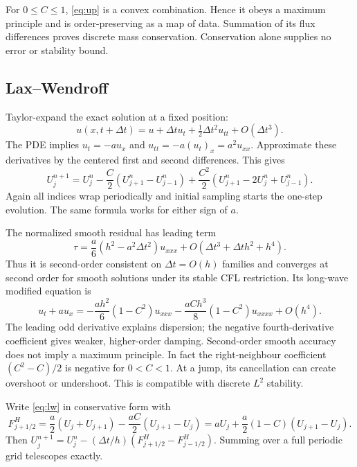 For $0\le C\le1$, \eqref{eq:up} is a convex combination. Hence it obeys a maximum principle and is order-preserving as a map of data. Summation of its flux differences proves discrete mass conservation. Conservation alone supplies no error or stability bound.

\subsection{Lax--Wendroff}
Taylor-expand the exact solution at a fixed position:
\begin{equation}
 u(x,t+\Delta t)=u+\Delta t u_t+\tfrac12\Delta t^2u_{tt}+O(\Delta t^3).
\end{equation}
The PDE implies $u_t=-a u_x$ and $u_{tt}=-a(u_t)_x=a^2u_{xx}$. Approximate these derivatives by the centered first and second differences. This gives
\begin{equation}\label{eq:lw}
 U_j^{n+1}=U_j^n-\frac C2(U_{j+1}^n-U_{j-1}^n)
 +\frac{C^2}{2}(U_{j+1}^n-2U_j^n+U_{j-1}^n).
\end{equation}
Again all indices wrap periodically and initial sampling starts the one-step evolution. The same formula works for either sign of $a$.

The normalized smooth residual has leading term
\begin{equation}
 \tau=\frac{a}{6}(h^2-a^2\Delta t^2)u_{xxx}
 +O(\Delta t^3+\Delta t h^2+h^4).
\end{equation}
Thus it is second-order consistent on $\Delta t=O(h)$ families and converges at second order for smooth solutions under its stable CFL restriction. Its long-wave modified equation is
\begin{equation}\label{eq:modlw}
 u_t+a u_x=-\frac{ah^2}{6}(1-C^2)u_{xxx}
 -\frac{aCh^3}{8}(1-C^2)u_{xxxx}+O(h^4).
\end{equation}
The leading odd derivative explains dispersion; the negative fourth-derivative coefficient gives weaker, higher-order damping. Second-order smooth accuracy does not imply a maximum principle. In fact the right-neighbour coefficient $(C^2-C)/2$ is negative for $0<C<1$. At a jump, its cancellation can create overshoot or undershoot. This is compatible with discrete $L^2$ stability.

Write \eqref{eq:lw} in conservative form with
\begin{equation}\label{eq:lwflux}
 F^{H}_{j+1/2}=\frac a2(U_j+U_{j+1})-\frac{aC}{2}(U_{j+1}-U_j)
 =aU_j+\frac a2(1-C)(U_{j+1}-U_j).
\end{equation}
Then $U_j^{n+1}=U_j^n-(\Delta t/h)(F^H_{j+1/2}-F^H_{j-1/2})$. Summing over a full periodic grid telescopes exactly.

